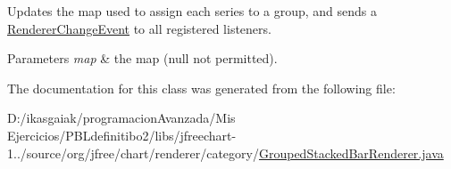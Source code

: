 Updates the map used to assign each series to a group, and sends a \mbox{\hyperlink{}{Renderer\+Change\+Event}} to all registered listeners.


\begin{DoxyParams}{Parameters}
{\em map} & the map ({\ttfamily null} not permitted). \\
\hline
\end{DoxyParams}


The documentation for this class was generated from the following file\+:\begin{DoxyCompactItemize}
\item 
D\+:/ikasgaiak/programacion\+Avanzada/\+Mis Ejercicios/\+P\+B\+Ldefinitibo2/libs/jfreechart-\/1../source/org/jfree/chart/renderer/category/\mbox{\hyperlink{_grouped_stacked_bar_renderer_8java}{Grouped\+Stacked\+Bar\+Renderer.\+java}}\end{DoxyCompactItemize}
